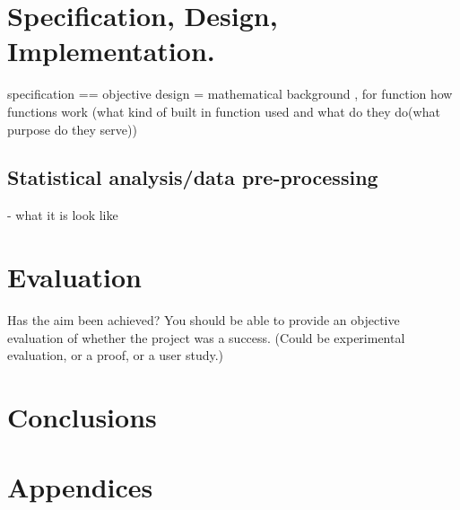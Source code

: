 \documentclass[12pt]{article}
\begin{document}
\section{Specification, Design, Implementation.}
specification == objective
design = mathematical background , for function how functions work (what kind of built in function used and what do they do(what purpose do they serve))
\subsection{Statistical analysis/data pre-processing}
- what it is look like

\newpage

\section{Evaluation}
Has the aim been achieved? You should be able to provide an objective evaluation of whether the project was a success. (Could be experimental evaluation, or a proof, or a user study.)

\section{Conclusions}

\newpage



\appendix
\section*{Appendices}
\renewcommand{\thesubsection}{\Alph{subsection}}
\end{document}

